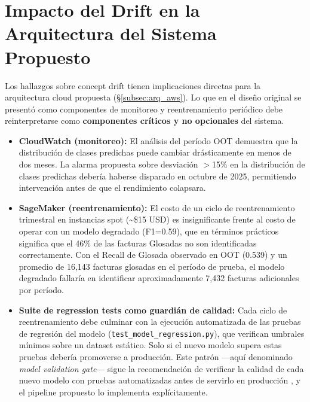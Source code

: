 \documentclass[12pt,letterpaper]{report}
\begin{document}
\section{Impacto del Drift en la Arquitectura del Sistema Propuesto}

Los hallazgos sobre concept drift tienen implicaciones directas para la arquitectura cloud propuesta (§\ref{subsec:arq_aws}). Lo que en el diseño original se presentó como componentes de monitoreo y reentrenamiento periódico debe reinterpretarse como \textbf{componentes críticos y no opcionales} del sistema.

\begin{itemize}
    \item \textbf{CloudWatch (monitoreo):} El análisis del período OOT demuestra que la distribución de clases predichas puede cambiar drásticamente en menos de dos meses. La alarma propuesta sobre desviación $>$15\% en la distribución de clases predichas debería haberse disparado en octubre de 2025, permitiendo intervención antes de que el rendimiento colapsara.

    \item \textbf{SageMaker (reentrenamiento):} El costo de un ciclo de reentrenamiento trimestral en instancias spot (\textasciitilde\$15 USD) es insignificante frente al costo de operar con un modelo degradado (F1=0.59), que en términos prácticos significa que el 46\% de las facturas Glosadas no son identificadas correctamente. Con el Recall de Glosada observado en OOT (0.539) y un promedio de 16,143 facturas glosadas en el período de prueba, el modelo degradado fallaría en identificar aproximadamente 7,432 facturas adicionales por período.

    \item \textbf{Suite de regression tests como guardián de calidad:} Cada ciclo de reentrenamiento debe culminar con la ejecución automatizada de las pruebas de regresión del modelo (\texttt{test\_model\_regression.py}), que verifican umbrales mínimos sobre un dataset estático. Solo si el nuevo modelo supera estas pruebas debería promoverse a producción. Este patrón —aquí denominado \textit{model validation gate}— sigue la recomendación de verificar la calidad de cada nuevo modelo con pruebas automatizadas antes de servirlo en producción \cite{breck2017mltest}, y el pipeline propuesto lo implementa explícitamente.
\end{itemize}
\end{document}
